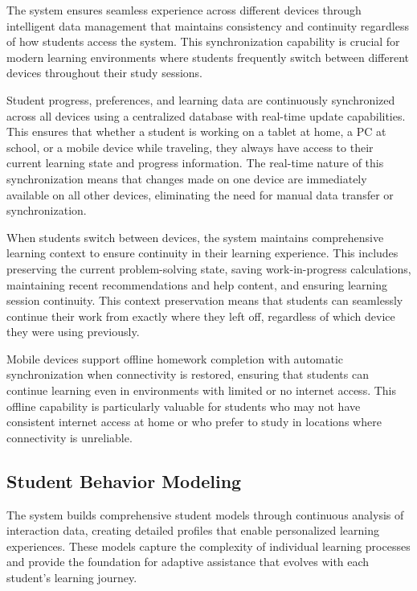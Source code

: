 \documentclass[conference]{IEEEtran}
\begin{document}
\begin{IEEEkeywords}
The system ensures seamless experience across different devices through intelligent data management that maintains consistency and continuity regardless of how students access the system. This synchronization capability is crucial for modern learning environments where students frequently switch between different devices throughout their study sessions.

Student progress, preferences, and learning data are continuously synchronized across all devices using a centralized database with real-time update capabilities. This ensures that whether a student is working on a tablet at home, a PC at school, or a mobile device while traveling, they always have access to their current learning state and progress information. The real-time nature of this synchronization means that changes made on one device are immediately available on all other devices, eliminating the need for manual data transfer or synchronization.

When students switch between devices, the system maintains comprehensive learning context to ensure continuity in their learning experience. This includes preserving the current problem-solving state, saving work-in-progress calculations, maintaining recent recommendations and help content, and ensuring learning session continuity. This context preservation means that students can seamlessly continue their work from exactly where they left off, regardless of which device they were using previously.

Mobile devices support offline homework completion with automatic synchronization when connectivity is restored, ensuring that students can continue learning even in environments with limited or no internet access. This offline capability is particularly valuable for students who may not have consistent internet access at home or who prefer to study in locations where connectivity is unreliable.

\subsection{Student Behavior Modeling}

The system builds comprehensive student models through continuous analysis of interaction data, creating detailed profiles that enable personalized learning experiences. These models capture the complexity of individual learning processes and provide the foundation for adaptive assistance that evolves with each student's learning journey.




\end{IEEEkeywords}
\end{document}
